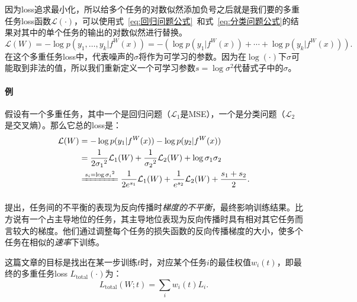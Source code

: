 \documentclass{ctexart}
\begin{document}
因为loss追求最小化，所以给多个任务的对数似然添加负号之后就是我们要的多重任务loss函数$\mathcal{L}(\cdot)$，可以使用式~\ref{eq:回归问题公式}~和式~\ref{eq:分类问题公式}的结果对其中的单个任务的输出的对数似然进行替换。
\begin{equation}
    \mathcal{L}(W) = - \log p(y_1, \ldots, y_k|f^W(x)) = - (\log p(y_1 | f^W(x)) + \cdots + \log p(y_k | f^W(x))).
\end{equation}
在这个多重任务loss中，代表噪声的$\sigma$将作为可学习的参数。因为在$\log(\cdot)$下$\sigma$可能取到非法的值，所以我们重新定义一个可学习参数$s=\log \sigma^2$代替式子中的$\sigma$。

\paragraph{例} 假设有一个多重任务，其中一个是回归问题（$\mathcal{L}_1$是MSE），一个是分类问题（$\mathcal{L}_2$是交叉熵）。那么它总的loss是：
\begin{equation}
    \begin{aligned}
        \mathcal{L}(W) &= - \log p(y_1|f^W(x)) - \log p(y_2|f^W(x)) \\
         &= \frac{1}{2{\sigma_1}^2} \mathcal{L}_1(W) + \frac{1}{{\sigma_2}^2} \mathcal{L}_2(W) + \log \sigma_1\sigma_2 \\
         &\xlongequal{s_i =\log {\sigma_i}^2} \frac{1}{2{e}^{s_1}} \mathcal{L}_1(W) + \frac{1}{{e}^{s_2}} \mathcal{L}_2(W) + \frac{s_1 + s_2}{2}.
    \end{aligned}
\end{equation}

\subsubsection{}

\citet{Chen18GradNorm}提出，任务间的不平衡的表现为反向传播时\emph{梯度的不平衡}，最终影响训练结果。比方说有一个占主导地位的任务，其主导地位表现为反向传播时具有相对其它任务而言较大的梯度。他们通过调整每个任务的损失函数的反向传播梯度的大小，使多个任务在相似的\emph{速率}下训练。

这篇文章的目标是找出在某一步训练$t$时，对应某个任务$i$的最佳权值$w_i(t)$，即最终的多重任务loss $L_\mathrm{total}(\cdot)$为：
\begin{equation}
    L_\mathrm{total}(W;t) = \sum_i w_i(t) L_i.
\end{equation}
\end{document}
